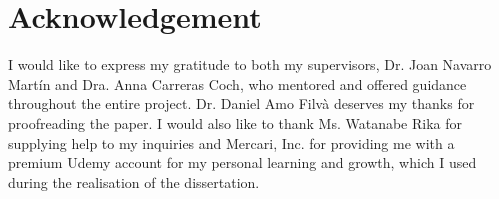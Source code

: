 \section{Acknowledgement} \label{chap-6}
    I would like to express my gratitude to both my supervisors, Dr. Joan Navarro Martín and Dra. Anna Carreras Coch, who mentored and offered guidance throughout the entire project. Dr. Daniel Amo Filvà deserves my thanks for proofreading the paper. I would also like to thank Ms. Watanabe Rika for supplying help to my inquiries and Mercari, Inc. for providing me with a premium Udemy account for my personal learning and growth, which I used during the realisation of the dissertation.